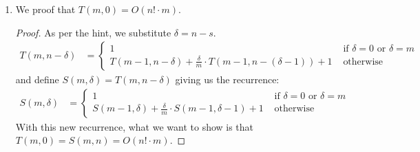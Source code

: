 \documentclass[12pt]{exam}
\begin{document}
\begin{questions}
\begin{solution}
\begin{enumerate}[label=(\alph*)]
\begin{proof}
      As such, let us consider the case where $|C_1| = m$ and $|C_2| = s$ and we have that $s \neq n$ and $ m + s \neq n$. In this case, the algorithm always makes at least one recursive call ($+1$), now with inputs $m - 1$ and $n$. As such, the expected number of calls is at least $T(m - 1, s) + 1$. However, in expectation, it makes one further recursive call with inputs $m-1, s+1$ in the case when the selected constraint $i$ is not satified. 

      Given that we know that the linear program is non-degenerate and that $|C_1| = m$ and $|C_2| = s$, there can be at most $n - s$ constraints in $C_1$ that could become equality constraints (since every feasible solution has at most $n$ equality constraints, and we've already accumulated $|C_2| = s$ of them).

      As such, an upperbound on the expected number of recursive calls is given by:
      \begin{align*}
        T(m,s) &\leq \underbrace{1}_{\text{always at least 1}} \\
        &+ \underbrace{T(m-1, s)}_{\text{number of calls needed to solve } C_1 \setminus \{i\}, C_2 } \\
        &+ \underbrace{\frac{n-s}{m}}_{\text{max constraints not yet equality}} \underbrace{T(m-1, s+1)}_{\text{number of call to solve } C_1 \setminus \{i\}, C_2 \cup \{i\}}
      \end{align*}
      This is precisely what we wanted to proof.
     \end{proof}

     \item
      We proof that $T(m,0) = O(n! \cdot m)$.
      \begin{proof}
        As per the hint, we substitute $\delta = n - s$.
        \begin{align*}
          T(m, n - \delta) &= \begin{cases}
            1 & \text{ if } \delta = 0 \text{ or } \delta = m \\
            T(m-1, n - \delta) + \frac{\delta}{m} \cdot T(m-1, n - (\delta - 1)) + 1 & \text{ otherwise}
          \end{cases}
        \end{align*}
        and define $S(m, \delta) = T(m, n - \delta)$ giving us the recurrence:
        \begin{align*}
          S(m, \delta) &= \begin{cases}
            1 & \text{ if } \delta = 0 \text{ or } \delta = m \\
            S(m-1, \delta) + \frac{\delta}{m} \cdot S(m-1, \delta - 1) + 1 & \text{ otherwise}
          \end{cases}
        \end{align*}
        With this new recurrence, what we want to show is that $T(m, 0) = S(m,n) = O(n!\cdot m)$.


\end{proof}
\end{enumerate}
\end{solution}
\end{questions}
\end{document}
